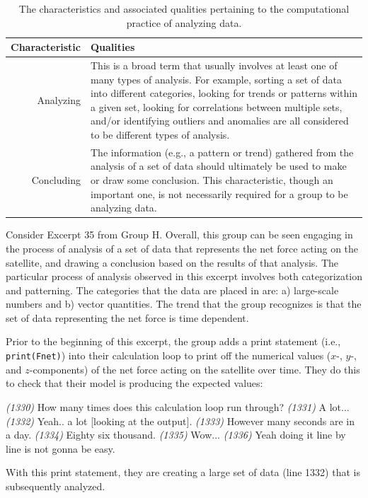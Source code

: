 \documentclass{msuphddissertation}
\begin{document}
\begin{doublespace}
\begin{table}
\begin{tabular}{r|p{}}
Characteristic & Qualities \\\hline\hline
Analyzing & This is a broad term that usually involves at least one of many types of analysis.  For example, sorting a set of data into different categories, looking for trends or patterns within a given set, looking for correlations between multiple sets, and/or identifying outliers and anomalies are all considered to be different types of analysis.\\
Concluding & The information (e.g., a pattern or trend) gathered from the analysis of a set of data should ultimately be used to make or draw some conclusion.  This characteristic, though an important one, is not necessarily required for a group to be analyzing data.\\
\end{tabular}\caption{The characteristics and associated qualities pertaining to the computational practice of analyzing data.}\label{CH5:AnalyzingData}
\end{table}

Consider Excerpt 35 from Group H.  Overall, this group can be seen engaging in the process of analysis of a set of data that represents the net force acting on the satellite, and drawing a conclusion based on the results of that analysis.  The particular process of analysis observed in this excerpt involves both categorization and patterning.  The categories that the data are placed in are: a) large-scale numbers and b) vector quantities.  The trend that the group recognizes is that the set of data representing the net force is time dependent.

Prior to the beginning of this excerpt, the group adds a print statement (i.e., \texttt{print(Fnet)}) into their calculation loop to print off the numerical values ($x$-, $y$-, and $z$-components) of the net force acting on the satellite over time.  They do this to check that their model is producing the expected values:  \begin{description}
\SD \textit{(1330)} How many times does this {calculation loop} run through?
\SB \textit{(1331)} A lot...		
\SD \textit{(1332)} Yeah.. a lot [looking at the output].
\SB \textit{(1333)} However many seconds are in a day.
\SA \textit{(1334)} Eighty six thousand.
\SD \textit{(1335)} Wow...
\SB \textit{(1336)} Yeah doing it line by line is not gonna be easy.
\end{description}  With this print statement, they are creating a large set of data (line 1332) that is subsequently analyzed.


\end{doublespace}
\end{document}
